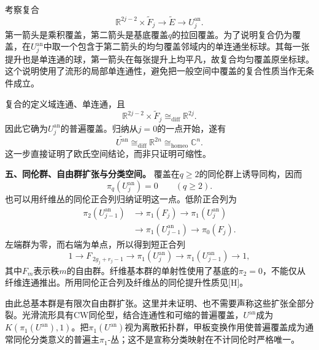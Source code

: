\documentclass[UTF8,a4paper]{ctexbook}
\begin{document}
考察复合
\[
\mathbb R^{2j-2}\times\widetilde F_j
\longrightarrow\widetilde E\longrightarrow U_j^{\mathrm{an}}.
\]
第一箭头是乘积覆盖，第二箭头是基底覆盖$q$的拉回覆盖。为了说明复合仍为覆盖，在$U_j^{\mathrm{an}}$中取一个包含于第二箭头的均匀覆盖邻域内的单连通坐标球。其每一张提升也是单连通的球，第一箭头在每张提升上均平凡，故复合均匀覆盖原坐标球。这个说明使用了流形的局部单连通性，避免把一般空间中覆盖的复合性质当作无条件成立。

复合的定义域连通、单连通，且
\[
\mathbb R^{2j-2}\times\widetilde F_j
\cong_{\mathrm{diff}}\mathbb R^{2j}.
\]
因此它确为$U_j^{\mathrm{an}}$的普遍覆盖。归纳从$j=0$的一点开始，遂有
\[
\widetilde{U^{\mathrm{an}}}
\cong_{\mathrm{diff}}\mathbb R^{2n}
\cong_{\mathrm{homeo}}\mathbb C^n.
\]
这一步直接证明了欧氏空间结论，而非只证明可缩性。

\par\medskip\noindent\textbf{五、同伦群、自由群扩张与分类空间。}
覆盖在$q\geq2$的同伦群上诱导同构，因而
\[
\pi_q(U_j^{\mathrm{an}})=0\qquad(q\geq2).
\]
也可以用纤维丛的同伦正合列归纳证明这一点。低阶正合列为
\[
\begin{split}
\pi_2(U_{j-1}^{\mathrm{an}})
&\longrightarrow\pi_1(F_j)
\longrightarrow\pi_1(U_j^{\mathrm{an}})\\
&\longrightarrow\pi_1(U_{j-1}^{\mathrm{an}})
\longrightarrow\pi_0(F_j).
\end{split}
\]
左端群为零，而右端为单点，所以得到短正合列
\[
1\longrightarrow F_{\,2g_j+r_j-1}
\longrightarrow\pi_1(U_j^{\mathrm{an}})
\longrightarrow\pi_1(U_{j-1}^{\mathrm{an}})
\longrightarrow1,
\]
其中$F_m$表示秩$m$的自由群。纤维基本群的单射性使用了基底的$\pi_2=0$，不能仅从纤维连通推出。所用同伦正合列及纤维丛的同伦提升性质见[H]。

由此总基本群是有限次自由群扩张。这里并未证明、也不需要声称这些扩张全部分裂。光滑流形具有CW同伦型，结合连通性和可缩的普遍覆盖，$U^{\mathrm{an}}$成为
$K(\pi_1(U^{\mathrm{an}}),1)$。把$\pi_1(U^{\mathrm{an}})$视为离散拓扑群，甲板变换作用使普遍覆盖成为通常同伦分类意义的普遍主$\pi_1$-丛；这不是宣称分类映射在不计同伦时严格唯一。
\end{document}
